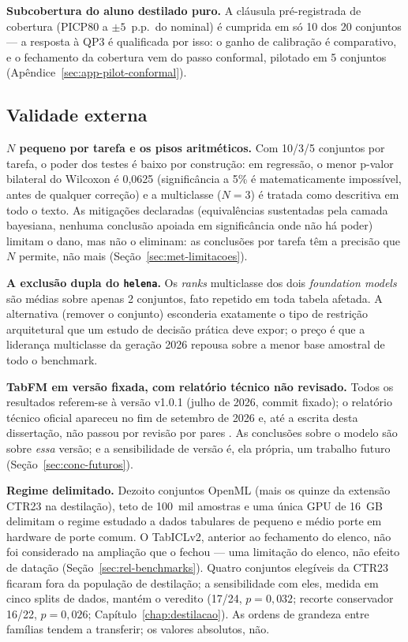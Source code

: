 \textbf{Subcobertura do aluno destilado puro.} A cláusula
pré-registrada de cobertura (PICP80 a $\pm5$~p.p.\ do nominal) é
cumprida em só 10 dos 20 conjuntos --- a resposta à QP3 é
qualificada por isso: o ganho de calibração é comparativo, e o
fechamento da cobertura vem do passo conformal, pilotado em 5
conjuntos (Apêndice~\ref{sec:app-pilot-conformal}).

\subsection{Validade externa}

\textbf{$N$ pequeno por tarefa e os pisos aritméticos.} Com 10/3/5
conjuntos por tarefa, o poder dos testes é baixo por construção: em
regressão, o menor p-valor bilateral do Wilcoxon é 0,0625
(significância a 5\% é matematicamente impossível, antes de qualquer
correção) e a multiclasse ($N{=}3$) é tratada como descritiva em todo
o texto. As mitigações declaradas (equivalências sustentadas pela
camada bayesiana, nenhuma conclusão apoiada em significância onde não há
poder) limitam o dano, mas não o eliminam: as conclusões por tarefa
têm a precisão que $N$ permite, não mais
(Seção~\ref{sec:met-limitacoes}).

\textbf{A exclusão dupla do \texttt{helena}.} Os \emph{ranks}
multiclasse dos dois \emph{foundation models} são médias sobre apenas 2
conjuntos, fato repetido em toda tabela afetada. A alternativa
(remover o conjunto) esconderia exatamente o tipo de restrição
arquitetural que um estudo de decisão prática deve expor; o preço é que
a liderança multiclasse da geração 2026 repousa sobre a menor base
amostral de todo o benchmark.

\textbf{TabFM em versão fixada, com relatório técnico não revisado.}
Todos os resultados referem-se à versão v1.0.1 (julho de 2026, commit
fixado); o relatório técnico oficial \citep{kong2026} apareceu no fim de
setembro de 2026 e, até a escrita desta dissertação, não passou por
revisão por pares \citep{tabfm2026}. As conclusões sobre o modelo são
sobre \emph{essa} versão; e a sensibilidade de versão é, ela própria,
um trabalho futuro (Seção~\ref{sec:conc-futuros}).

\textbf{Regime delimitado.} Dezoito conjuntos OpenML (mais os quinze da
extensão CTR23 na destilação), teto de 100~mil amostras e uma única GPU
de 16~GB delimitam o regime estudado a dados tabulares de pequeno e
médio porte em hardware de porte comum. O TabICLv2, anterior ao
fechamento do elenco, não foi considerado na ampliação que o fechou
--- uma limitação do elenco, não efeito de datação
(Seção~\ref{sec:rel-benchmarks}). Quatro conjuntos elegíveis
da CTR23 ficaram fora da população de destilação; a sensibilidade
com eles, medida em cinco splits de dados, mantém o veredito (17/24,
$p=0{,}032$; recorte conservador 16/22, $p=0{,}026$;
Capítulo~\ref{chap:destilacao}). As ordens de grandeza entre
famílias tendem a transferir; os valores absolutos, não.

